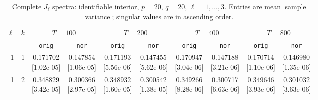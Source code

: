 \documentclass[12pt,letterpaper]{article}
\def\spacingset#1{\renewcommand{\baselinestretch}{#1}\small\normalsize}
\theoremstyle{plain}
\theoremstyle{definition}
\begin{document}
\clearpage
\begin{table}[p]
\begingroup
\spacingset{1.0}
\small\centering
\caption{Complete $J_\ell$ spectra: identifiable interior, $p=20$, $q=20$, $\ell=1,\ldots,3$. Entries are mean [sample variance]; singular values are in ascending order.}
\label{s23:lambda:alltab:spectra:p20q20interior:1-3}
\footnotesize
\setlength{\tabcolsep}{2.2pt}
\renewcommand{\arraystretch}{1.03}
\begin{adjustbox}{max width=\linewidth}
\begin{tabular}{@{}rr*{8}{c}@{}}
\toprule
$\ell$ & $k$ & \multicolumn{2}{c}{$T=100$} & \multicolumn{2}{c}{$T=200$} & \multicolumn{2}{c}{$T=400$} & \multicolumn{2}{c}{$T=800$}\\
\cmidrule(lr){3-4}\cmidrule(lr){5-6}\cmidrule(lr){7-8}\cmidrule(lr){9-10}
 &  & \texttt{orig} & \texttt{nor} & \texttt{orig} & \texttt{nor} & \texttt{orig} & \texttt{nor} & \texttt{orig} & \texttt{nor}\\
\midrule
1 & 1 & \shortstack{0.171702\\[-1pt]{\scriptsize[1.02e-05]}} & \shortstack{0.147854\\[-1pt]{\scriptsize[1.06e-05]}} & \shortstack{0.171193\\[-1pt]{\scriptsize[5.56e-06]}} & \shortstack{0.147455\\[-1pt]{\scriptsize[5.62e-06]}} & \shortstack{0.170947\\[-1pt]{\scriptsize[3.04e-06]}} & \shortstack{0.147188\\[-1pt]{\scriptsize[3.21e-06]}} & \shortstack{0.170714\\[-1pt]{\scriptsize[1.10e-06]}} & \shortstack{0.146980\\[-1pt]{\scriptsize[1.35e-06]}}\\
1 & 2 & \shortstack{0.348829\\[-1pt]{\scriptsize[3.42e-05]}} & \shortstack{0.300366\\[-1pt]{\scriptsize[2.97e-05]}} & \shortstack{0.348932\\[-1pt]{\scriptsize[1.60e-05]}} & \shortstack{0.300542\\[-1pt]{\scriptsize[1.38e-05]}} & \shortstack{0.349266\\[-1pt]{\scriptsize[8.28e-06]}} & \shortstack{0.300717\\[-1pt]{\scriptsize[6.63e-06]}} & \shortstack{0.349646\\[-1pt]{\scriptsize[3.93e-06]}} & \shortstack{0.301032\\[-1pt]{\scriptsize[3.63e-06]}}\\

\end{tabular}
\end{adjustbox}
\end{table}
\end{document}
